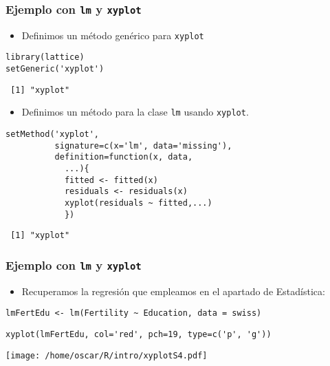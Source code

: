 \documentclass[xcolor={usenames,svgnames,dvipsnames}]{beamer}
\begin{document}
\begin{frame}[fragile]
\frametitle{Ejemplo con \texttt{lm} y \texttt{xyplot}}
\label{sec-3-3-2}

\begin{itemize}
\item Definimos un método genérico para \texttt{xyplot}
\end{itemize}

\lstset{language=R}
\begin{lstlisting}
library(lattice)
setGeneric('xyplot')
\end{lstlisting}

\begin{verbatim}
 [1] "xyplot"
\end{verbatim}

\begin{itemize}
\item Definimos un método para la clase \texttt{lm} usando \texttt{xyplot}.
\end{itemize}

\lstset{language=R}
\begin{lstlisting}
setMethod('xyplot',
          signature=c(x='lm', data='missing'),
          definition=function(x, data,
            ...){
            fitted <- fitted(x)
            residuals <- residuals(x)
            xyplot(residuals ~ fitted,...)
            })
\end{lstlisting}

\begin{verbatim}
 [1] "xyplot"
\end{verbatim}
\end{frame}
\begin{frame}[fragile]
\frametitle{Ejemplo con \texttt{lm} y \texttt{xyplot}}
\label{sec-3-3-3}

\begin{itemize}
\item Recuperamos la regresión que empleamos en el apartado de Estadística:
\end{itemize}

\lstset{language=R}
\begin{lstlisting}
lmFertEdu <- lm(Fertility ~ Education, data = swiss)
\end{lstlisting}



\lstset{language=R}
\begin{lstlisting}
xyplot(lmFertEdu, col='red', pch=19, type=c('p', 'g'))
\end{lstlisting}

\texttt{[image: /home/oscar/R/intro/xyplotS4.pdf]}
\end{frame}
\end{document}
